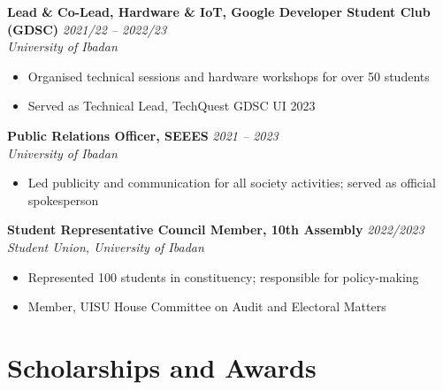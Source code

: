 \documentclass[10pt, a4paper]{article}
\newcommand{\cventry}[4]{%
  \noindent\textbf{#1} \hfill \textit{#2}\\%
  \textit{#3} \hfill \small{#4}\\[-4pt]%
}
\begin{document}
\vspace{4pt}
\cventry{Lead \& Co-Lead, Hardware \& IoT, Google Developer Student Club (GDSC)}{2021/22 -- 2022/23}{University of Ibadan}{}
\begin{itemize}
  \item Organised technical sessions and hardware workshops for over 50 students
  \item Served as Technical Lead, TechQuest GDSC UI 2023
\end{itemize}

\vspace{4pt}
\cventry{Public Relations Officer, SEEES}{2021 -- 2023}{University of Ibadan}{}
\begin{itemize}
  \item Led publicity and communication for all society activities; served as official spokesperson
\end{itemize}

\vspace{4pt}
\cventry{Student Representative Council Member, 10th Assembly}{2022/2023}{Student Union, University of Ibadan}{}
\begin{itemize}
  \item Represented 100 students in constituency; responsible for policy-making
  \item Member, UISU House Committee on Audit and Electoral Matters
\end{itemize}

\section{Scholarships and Awards}
\end{document}
